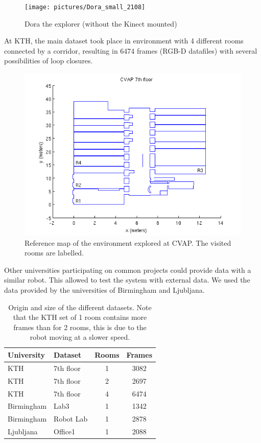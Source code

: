\begin{figure}[h]
 \begin{center}
 \texttt{[image: pictures/Dora\_small\_2108]}
 \end{center}
\caption{Dora the explorer (without the Kinect mounted)}
\end{figure}

At \gls{KTH}, the main dataset took place in environment with 4 different rooms connected by a corridor, resulting in 6474 frames (RGB-D datafiles) with several possibilities of loop closures. 

\begin{figure}[H]
\centering
\includegraphics[width=1\textwidth]{figures/cvap_7th}
\caption{Reference map of the environment explored at CVAP. The visited rooms are labelled.}
\end{figure}

Other universities participating on common projects could provide data with a similar robot. This allowed to test the system with external data. We used the data provided by the universities of Birmingham and Ljubljana.

\begin{table}[H]
 \begin{center}
  \begin{tabular}{llcc}
  \hline
  University & Dataset & Rooms & Frames \\
  \hline
  KTH & 7th floor & 1 & 3082 \\
  KTH & 7th floor & 2 & 2697 \\
  KTH & 7th floor & 4 & 6474 \\
  Birmingham & Lab3 & 1 & 1342 \\
  Birmingham & Robot Lab & 1 & 2878 \\
  Ljubljana & Office1 & 1 & 2088 \\
  \hline
  \end{tabular}
 \end{center}
 \caption{Origin and size of the different datasets. Note that the KTH set of 1 room contains more frames than for 2 rooms, this is due to the robot moving at a slower speed.}
\end{table}

